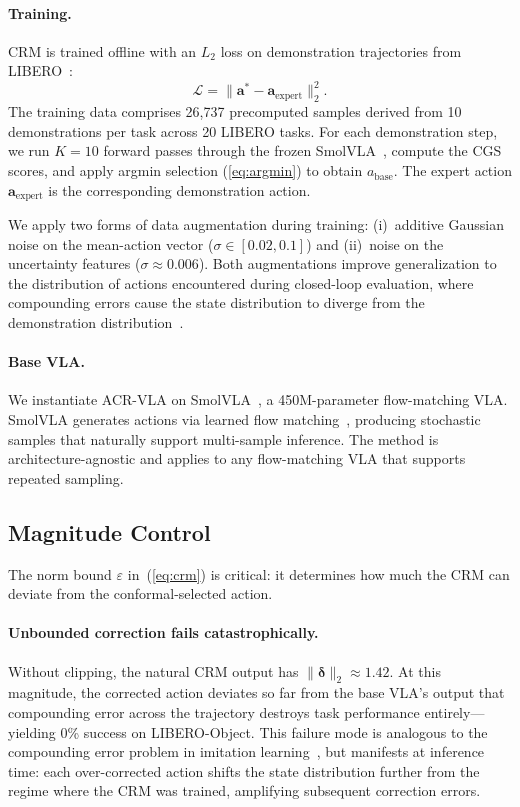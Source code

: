 \paragraph{Training.}
CRM is trained offline with an $L_2$ loss on demonstration trajectories from LIBERO~\cite{liu2023libero}:
\begin{equation}
  \mathcal{L} = \bigl\|\mathbf{a}^* - \mathbf{a}_{\mathrm{expert}}\bigr\|_2^2.
  \label{eq:loss}
\end{equation}
The training data comprises 26{,}737 precomputed samples derived from 10 demonstrations per task across 20 LIBERO tasks. For each demonstration step, we run $K{=}10$ forward passes through the frozen SmolVLA~\cite{shukor2025smolvla}, compute the CGS scores, and apply argmin selection (\ref{eq:argmin}) to obtain $a_{\mathrm{base}}$. The expert action $\mathbf{a}_{\mathrm{expert}}$ is the corresponding demonstration action.

We apply two forms of data augmentation during training: (i)~additive Gaussian noise on the mean-action vector ($\sigma \in [0.02, 0.1]$) and (ii)~noise on the uncertainty features ($\sigma \approx 0.006$). Both augmentations improve generalization to the distribution of actions encountered during closed-loop evaluation, where compounding errors cause the state distribution to diverge from the demonstration distribution~\cite{ross2011dagger}.

\paragraph{Base VLA.}
We instantiate ACR-VLA on SmolVLA~\cite{shukor2025smolvla}, a 450M-parameter flow-matching VLA. SmolVLA generates actions via learned flow matching~\cite{lipman2023flow}, producing stochastic samples that naturally support multi-sample inference. The method is architecture-agnostic and applies to any flow-matching VLA that supports repeated sampling.

\subsection{Magnitude Control}
\label{sec:magnitude}

The norm bound $\varepsilon$ in~(\ref{eq:crm}) is critical: it determines how much the CRM can deviate from the conformal-selected action.

\paragraph{Unbounded correction fails catastrophically.}
Without clipping, the natural CRM output has $\|\boldsymbol{\delta}\|_2 \approx 1.42$. At this magnitude, the corrected action deviates so far from the base VLA's output that compounding error across the trajectory destroys task performance entirely---yielding 0\% success on LIBERO-Object. This failure mode is analogous to the compounding error problem in imitation learning~\cite{ross2011dagger}, but manifests at inference time: each over-corrected action shifts the state distribution further from the regime where the CRM was trained, amplifying subsequent correction errors.

